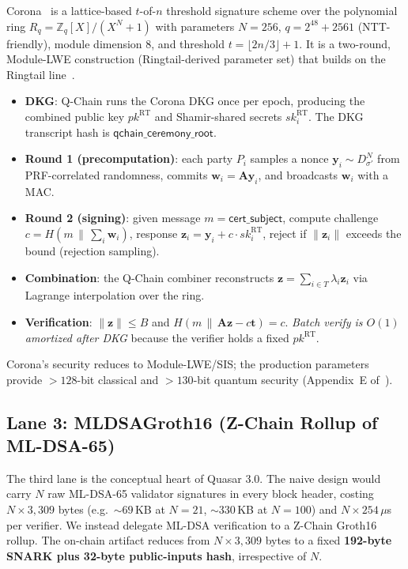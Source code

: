 Corona~\cite{corona} is a lattice-based $t$-of-$n$ threshold
signature scheme over the polynomial ring $R_q = \mathbb{Z}_q[X]/(X^N+1)$
with parameters $N = 256$, $q = 2^{48} + 2561$ (NTT-friendly), module
dimension 8, and threshold $t = \lfloor 2n/3 \rfloor + 1$. It is a
two-round, Module-LWE construction (Ringtail-derived parameter set)
that builds on the Ringtail line~\cite{ringtail}.

\begin{itemize}[leftmargin=2em,nosep]
\item \textbf{DKG}: Q-Chain runs the Corona DKG once per epoch,
      producing the combined public key $\mathit{pk}^{\mathrm{RT}}$ and
      Shamir-shared secrets $\mathit{sk}_i^{\mathrm{RT}}$. The DKG
      transcript hash is $\mathsf{qchain\_ceremony\_root}$.
\item \textbf{Round 1 (precomputation)}: each party $P_i$ samples a nonce
      $\mathbf{y}_i \sim D_{\sigma'}^N$ from PRF-correlated randomness,
      commits $\mathbf{w}_i = \mathbf{A}\mathbf{y}_i$, and broadcasts
      $\mathbf{w}_i$ with a MAC.
\item \textbf{Round 2 (signing)}: given message
      $m = \mathsf{cert\_subject}$, compute challenge
      $c = H(m \,\|\, \sum_i \mathbf{w}_i)$, response
      $\mathbf{z}_i = \mathbf{y}_i + c \cdot \mathit{sk}_i^{\mathrm{RT}}$,
      reject if $\|\mathbf{z}_i\|$ exceeds the bound (rejection sampling).
\item \textbf{Combination}: the Q-Chain combiner reconstructs
      $\mathbf{z} = \sum_{i \in T} \lambda_i \mathbf{z}_i$ via Lagrange
      interpolation over the ring.
\item \textbf{Verification}: $\|\mathbf{z}\| \leq B$ and
      $H(m \,\|\, \mathbf{A}\mathbf{z} - c\mathbf{t}) = c$.
      \emph{Batch verify is $O(1)$ amortized after DKG} because the
      verifier holds a fixed $\mathit{pk}^{\mathrm{RT}}$.
\end{itemize}

Corona's security reduces to Module-LWE/SIS;
the production parameters provide $> 128$-bit classical and $> 130$-bit
quantum security (Appendix~E of~\cite{qcert-proof}).

\subsection{Lane 3: MLDSAGroth16 (Z-Chain Rollup of ML-DSA-65)}
\label{sec:lane3}

The third lane is the conceptual heart of Quasar 3.0. The naive design
would carry $N$ raw ML-DSA-65 validator signatures in every block header,
costing $N \times 3{,}309$ bytes (e.g.\ ${\sim}69$\,KB at $N{=}21$,
${\sim}330$\,KB at $N{=}100$) and $N \times 254\,\mu$s per verifier. We
instead delegate ML-DSA verification to a Z-Chain Groth16 rollup. The
on-chain artifact reduces from $N \times 3{,}309$ bytes to a fixed
\textbf{192-byte SNARK plus 32-byte public-inputs hash}, irrespective of
$N$.

